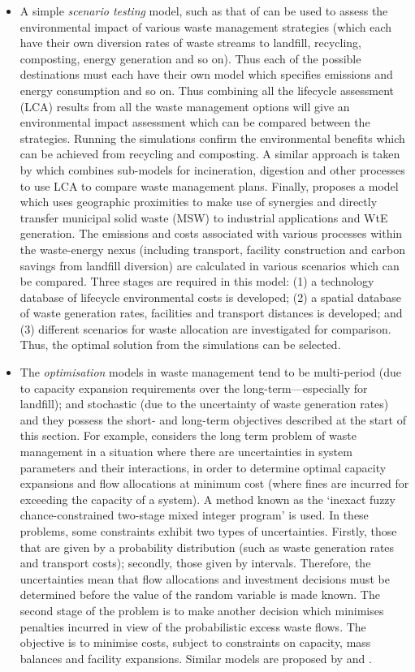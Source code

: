\begin{itemize}
	\item A simple \emph{scenario testing} model, such as that of \citet{Bovea2006} can be used to assess the environmental impact of various waste management strategies (which each have their own diversion rates of waste streams to landfill, recycling, composting, energy generation and so on). Thus each of the possible destinations must each have their own model which specifies emissions and energy consumption and so on. Thus combining all the lifecycle assessment (LCA) results from all the waste management options will give an environmental impact assessment which can be compared between the strategies. Running the simulations confirm the environmental benefits which can be achieved from recycling and composting. A similar approach is taken by \citep{Eriksson2002} which combines sub-models for incineration, digestion and other processes to use LCA to compare waste management plans. Finally, \citet{Geng2010} proposes a model which uses geographic proximities to make use of synergies and directly transfer municipal solid waste (MSW) to industrial applications and WtE generation. The emissions and costs associated with various processes within the waste-energy nexus (including transport, facility construction and carbon savings from landfill diversion) are calculated in various scenarios which can be compared. Three stages are required in this model: (1) a technology database of lifecycle environmental costs is developed; (2) a spatial database of waste generation rates, facilities and transport distances is developed; and (3) different scenarios for waste allocation are investigated for comparison. Thus, the optimal solution from the simulations can be selected.
	\item The \emph{optimisation} models in waste management tend to be multi-period (due to capacity expansion requirements over the long-term---especially for landfill); and stochastic (due to the uncertainty of waste generation rates) and they possess the short- and long-term objectives described at the start of this section. For example, \citet{Guo2009} considers the long term problem of waste management in a situation where there are uncertainties in system parameters and their interactions, in order to determine optimal capacity expansions and flow allocations at minimum cost (where fines are incurred for exceeding the capacity of a system). A method known as the `inexact fuzzy chance-constrained two-stage mixed integer program' is used. In these problems, some constraints exhibit two types of uncertainties. Firstly, those that are given by a probability distribution (such as waste generation rates and transport costs); secondly, those given by intervals. Therefore, the uncertainties mean that flow allocations and investment decisions must be determined before the value of the random variable is made known. The second stage of the problem is to make another decision which minimises penalties incurred in view of the probabilistic excess waste flows. The objective is to minimise costs, subject to constraints on capacity, mass balances and facility expansions. Similar models are proposed by \citet{Li2006} and \citet{Xi2010}. 

\end{itemize}
